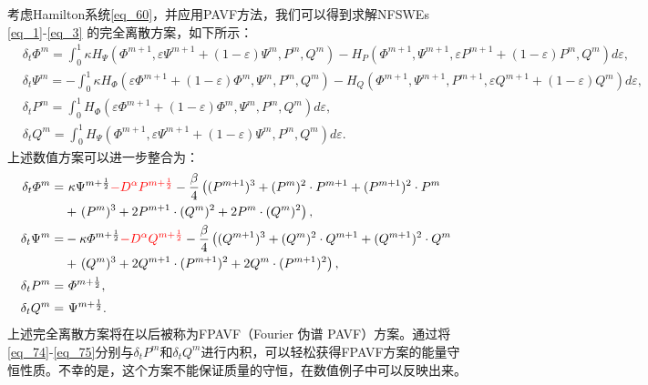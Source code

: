 考虑Hamilton系统\eqref{eq_60}，并应用PAVF方法，我们可以得到求解NFSWEs \eqref{eq_1}-\eqref{eq_3} 的完全离散方案，如下所示：
\begin{align}
&\delta_{t} \varPhi^{m}=\int_{0}^{1}\kappa H_{\Psi}\left(\varPhi^{m+1}, \varepsilon \Psi^{m+1}+(1-\varepsilon) \Psi^{m}, P^{m}, Q^{m}\right)-H_{P}\left(\varPhi^{m+1}, \Psi^{m+1}, \varepsilon P^{m+1}+(1-\varepsilon) P^{m}, Q^{m}\right)d \varepsilon,\label{eq_70}\\
&\delta_{t} \Psi^{m}=-\int_{0}^{1}\kappa H_{\varPhi}\left(\varepsilon \varPhi^{m+1}+(1-\varepsilon) \varPhi^{m}, \Psi^{m}, P^{m}, Q^{m}\right)-H_{Q}\left(\varPhi^{m+1}, \Psi^{m+1}, P^{m+1}, \varepsilon Q^{m+1}+(1-\varepsilon) Q^{m}\right)d\varepsilon,\label{eq_71}\\
&\delta_{t} P^{m}=\int_{0}^{1}H_{\varPhi}\left(\varepsilon \varPhi^{m+1}+(1-\varepsilon) \varPhi^{m}, \Psi^{m}, P^{m}, Q^{m}\right) d \varepsilon,\label{eq_72}\\
&\delta_{t} Q^{m}=\int_{0}^{1}H_{\Psi}\left(\varPhi^{m+1}, \varepsilon \Psi^{m+1}+(1-\varepsilon) \Psi^{m}, P^{m}, Q^{m}\right) d \varepsilon.\label{eq_73}
\end{align}
上述数值方案可以进一步整合为：
\begin{align}
\delta_{t} \varPhi^{m}=&~\kappa \Psi^{m+\frac{1}{2}}\textcolor[rgb]{1.00,0.00,0.00}{-D^{\alpha} P^{m+\frac{1}{2}}}-\frac{\beta}{4}\left( (P^{m+1})^3+ (P^{m})^{2}\cdot P^{m+1}+(P^{m+1})^{2}\cdot P^{m}\right.\nonumber\\
	&+\left. (P^{m})^{3}+2 P^{m+1}\cdot (Q^{m})^{2}+2 P^{m}\cdot (Q^{m})^{2}\right),\label{eq_74}\\
\delta_{t} \Psi^{m}=&-\kappa \varPhi^{m+\frac{1}{2}}\textcolor[rgb]{1.00,0.00,0.00}{-D^{\alpha} Q^{m+\frac{1}{2}}}-\frac{\beta}{4}\left( (Q^{m+1})^3+ (Q^{m})^{2}\cdot Q^{m+1}+(Q^{m+1})^{2}\cdot Q^{m}\right.\nonumber\\
	&+\left. (Q^{m})^{3}+2 Q^{m+1}\cdot (P^{m+1})^{2}+2 Q^{m}\cdot (P^{m+1})^{2}\right),\label{eq_75}\\
\delta_{t} P^{m}=&~\varPhi^{m+\frac{1}{2}},\label{eq_76}\\
\delta_{t} Q^{m}=&~\Psi^{m+\frac{1}{2}}.\label{eq_77}
\end{align}
上述完全离散方案将在以后被称为FPAVF（Fourier 伪谱 PAVF）方案。通过将\eqref{eq_74}-\eqref{eq_75}分别与$\delta_t P^{m}$和$\delta_t Q^{m}$进行内积，可以轻松获得FPAVF方案的能量守恒性质。不幸的是，这个方案不能保证质量的守恒，在数值例子中可以反映出来。


